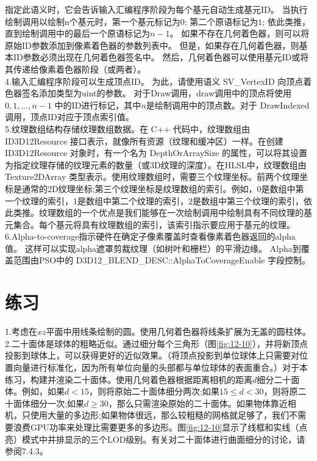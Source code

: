 \begin{flushleft}
指定此语义时，它会告诉输入汇编程序阶段为每个基元自动生成基元ID。 当执行绘制调用以绘制n个基元时，第一个基元标记为$0$; 第二个原语标记为$1$; 依此类推，直到绘制调用中的最后一个原语标记为$n-1$。 如果不存在几何着色器，则可以将原始ID参数添加到像素着色器的参数列表中。 但是，如果存在几何着色器，则基本ID参数必须出现在几何着色器签名中。 然后，几何着色器可以使用基元ID或将其传递给像素着色器阶段（或两者）。\\

4.输入汇编程序阶段可以生成顶点ID。 为此，请使用语义 SV\_VertexID 向顶点着色器签名添加类型为uint的参数。 对于Draw调用，draw调用中的顶点将使用 $0,1,...,n-1$ 中的ID进行标记，其中$n$是绘制调用中的顶点数。对于 DrawIndexed 调用，顶点ID对应于顶点索引值。\\

5.纹理数组结构存储纹理数组数据。在 C++ 代码中，纹理数组由 ID3D12Resource 接口表示，就像所有资源（纹理和缓冲区）一样。在创建 ID3D12Resource 对象时，有一个名为 DepthOrArraySize 的属性，可以将其设置为指定纹理存储的纹理元素的数量（或3D纹理的深度）。在HLSL中，纹理数组由 Texture2DArray 类型表示。使用纹理数组时，需要三个纹理坐标。前两个纹理坐标是通常的2D纹理坐标;第三个纹理坐标是纹理数组的索引。例如，$0$是数组中第一个纹理的索引，$1$是数组中第二个纹理的索引，$2$是数组中第三个纹理的索引，依此类推。纹理数组的一个优点是我们能够在一次绘制调用中绘制具有不同纹理的基元集合。每个基元将具有纹理数组的索引，该索引指示要应用于基元的纹理。\\

6.Alpha-to-coverage指示硬件在确定子像素覆盖时查看像素着色器返回的alpha值。 这样可以实现alpha遮罩剪裁纹理（如树叶和栅栏）的平滑边缘。 Alpha到覆盖范围由PSO中的 D3D12\_BLEND\_DESC::AlphaToCoverageEnable 字段控制。\\
\end{flushleft}


\section{练习}
\begin{flushleft}
1.考虑在$xz$平面中用线条绘制的圆。使用几何着色器将线条扩展为无盖的圆柱体。\\
2.二十面体是球体的粗略近似。通过细分每个三角形（图\ref{fig:12-10}），并将新顶点投影到球体上，可以获得更好的近似效果。（将顶点投影到单位球体上只需要对位置向量进行标准化，因为所有单位向量的头部都与单位球体的表面重合。）对于本练习，构建并渲染二十面体。使用几何着色器根据距离相机的距离$d$细分二十面体。例如，如果$d<15$，则将原始二十面体细分两次;如果$15\leq d < 30$，则将原二十面体细分一次;如果$d\geq 30$，那么只需渲染原始的二十面体。如果物体靠近相机，只使用大量的多边形;如果物体很远，那么较粗糙的网格就足够了，我们不需要浪费GPU功率来处理比需要更多的多边形。图\ref{fig:12-10}显示了线框和实线（点亮）模式中并排显示的三个LOD级别。有关对二十面体进行曲面细分的讨论，请参阅7.4.3。\\
\end{flushleft}

